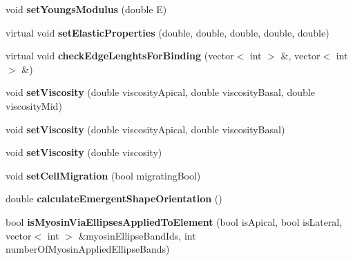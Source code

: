 \begin{DoxyCompactItemize}
\item 
\hypertarget{classShapeBase_a27bc09051d65ebc27e31b67462950070}{}void {\bfseries set\+Youngs\+Modulus} (double E)\label{classShapeBase_a27bc09051d65ebc27e31b67462950070}

\item 
\hypertarget{classShapeBase_aac3988352864bd06d7509b74977320d8}{}virtual void {\bfseries set\+Elastic\+Properties} (double, double, double, double, double)\label{classShapeBase_aac3988352864bd06d7509b74977320d8}

\item 
\hypertarget{classShapeBase_a87220daf74d141bc3073e256721f1336}{}virtual void {\bfseries check\+Edge\+Lenghts\+For\+Binding} (vector$<$ int $>$ \&, vector$<$ int $>$ \&)\label{classShapeBase_a87220daf74d141bc3073e256721f1336}

\item 
\hypertarget{classShapeBase_ac4e051a82edb9b987edfbd783076e348}{}void {\bfseries set\+Viscosity} (double viscosity\+Apical, double viscosity\+Basal, double viscosity\+Mid)\label{classShapeBase_ac4e051a82edb9b987edfbd783076e348}

\item 
\hypertarget{classShapeBase_a8b6ffc8d699795e4efb867efd065a679}{}void {\bfseries set\+Viscosity} (double viscosity\+Apical, double viscosity\+Basal)\label{classShapeBase_a8b6ffc8d699795e4efb867efd065a679}

\item 
\hypertarget{classShapeBase_ae17e8a052b0a2bf5b11f6d5498d61923}{}void {\bfseries set\+Viscosity} (double viscosity)\label{classShapeBase_ae17e8a052b0a2bf5b11f6d5498d61923}

\item 
\hypertarget{classShapeBase_a2823ab0e017445a2341898d40da167ec}{}void {\bfseries set\+Cell\+Migration} (bool migrating\+Bool)\label{classShapeBase_a2823ab0e017445a2341898d40da167ec}

\item 
\hypertarget{classShapeBase_a3eecbff8db98871f4b5f1ee0992f3d6d}{}double {\bfseries calculate\+Emergent\+Shape\+Orientation} ()\label{classShapeBase_a3eecbff8db98871f4b5f1ee0992f3d6d}

\item 
\hypertarget{classShapeBase_aaee2f3787e29bc671732e59e8589a634}{}bool {\bfseries is\+Myosin\+Via\+Ellipses\+Applied\+To\+Element} (bool is\+Apical, bool is\+Lateral, vector$<$ int $>$ \&myosin\+Ellipse\+Band\+Ids, int number\+Of\+Myosin\+Applied\+Ellipse\+Bands)\label{classShapeBase_aaee2f3787e29bc671732e59e8589a634}


\end{DoxyCompactItemize}
